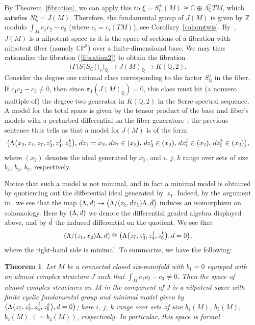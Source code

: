 \documentclass[11pt]{article}
\numberwithin{equation}{section}
\newcommand{\CP}{\mathbb{CP}}
\newcommand{\ZZ}{\mathbb{Z}}
\newcommand{\Q}{\mathbb{Q}}
\newcommand{\QQ}{\mathbb{Q}}
\newcommand{\C}{\mathbb{C}}
\numberwithin{equation}{section}
\newtheorem{Theorem}{Theorem}[section]
\begin{document}
By Theorem~\ref{fibration}, we can apply this to $\xi = S_{\C}^+(M) \cong \C \oplus \Lambda_{\C}^2 TM$, which satisfies ${N \xi = J(M)}$. Therefore, the fundamental group of $J(M)$ is given by $\ZZ$ modulo $\int_M\! c_1c_2-c_3$ (where ${c_i \! =\! c_i(TM)}$), see Corollary~\ref{cohomtwis}. By~\cite{M87}, $J(M)$ is a nilpotent space as it is the space of sections of a fibration with nilpotent fiber \big(namely $\CP^3$\big) over a finite-dimensional base. We may thus rationalize the fibration (\ref{fibration2}) to obtain the fibration \[\big(\Gamma\big(S\big(S_{\C}^+\big)\big)_s\big)_{\Q} \to J(M)_{\Q} \to K(\Q, 2).\] Consider the degree one rational class corresponding to the factor $S^1_{\QQ}$ in the fiber. If $c_1c_2 - c_3 \neq 0$, then since $\pi_1(J(M)_\Q) = 0$, this class must hit (a nonzero multiple of) the degree two generator in $K(\Q,2)$ in the Serre spectral sequence. A model for the total space is given by the tensor product of the base and fiber's models with a perturbed differential on the fiber generators~\cite[Section~4]{S77}; the previous sentence thus tells us that a model for $J(M)$ is of the form
\[\big(\Lambda\big(x_2, z_1, z_7, z_3^{i}, z_4^{j}, z_5^{k}\big),\, {\rm d}z_1 = x_2, \, {\rm d}z_7 \in (x_2), \, {\rm d}z_3^i \in (x_2), \, {\rm d}z_4^j \in (x_2),\, {\rm d}z_5^k \in (x_2)\big),
\] where $(x_2)$ denotes the ideal generated by $x_2$, and $i$, $j$, $k$ range over sets of size $b_4$, $b_3$, $b_2$, respectively.

Notice that such a model is not minimal, and in fact a minimal model is obtained by quotienting out the differential ideal generated by~$z_1$. Indeed, by the argument in~\cite[Proposition~2]{VS76} we see that the map $(\Lambda, {\rm d}) \to \big(\Lambda/(z_1, {\rm d}z_1)\Lambda, \bar{{\rm d}}\big)$ induces an isomorphism on cohomology.
Here by $(\Lambda,{\rm d})$ we denote the differential graded algebra displayed above, and by $\bar{{\rm d}}$ the induced differential on the quotient. We see that
\[
(\Lambda/(z_1, x_2)\Lambda, \bar{{\rm d}}) \cong \big(\Lambda\big(z_7, z_3^{i}, z_4^{j}, z_5^{k}\big), \bar{{\rm d}}=0\big),
\] where the right-hand side is minimal. To summarize, we have the following:

\begin{Theorem}\label{Qhomotopy6} Let $M$ be a connected closed six-manifold with $b_1 = 0$ equipped with an almost complex structure $J$ such that $\int_M c_1c_2-c_3 \neq 0$. Then the space of almost complex structures on~$M$ in the component of $J$ is a nilpotent space with finite cyclic fundamental group and minimal model given by $\big(\Lambda\big(z_7, z_3^{i}, z_4^{j}, z_5^{k}\big), {\rm d} = 0\big)$; here $i$, $j$, $k$ range over sets of size $b_4(M)$, $b_3(M)$, $b_2(M)$ $(=b_4(M))$, respectively. In particular, this space is formal.
\end{Theorem}
\end{document}
